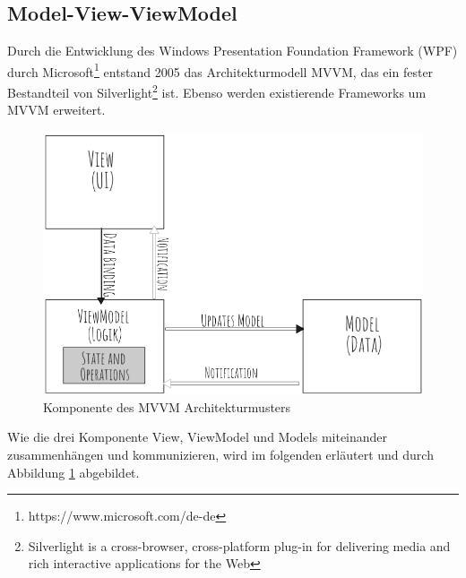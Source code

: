 \subsection{Model-View-ViewModel}
Durch die Entwicklung des Windows Presentation Foundation Framework (WPF) durch Microsoft\footnote{https://www.microsoft.com/de-de} entstand 2005 das Architekturmodell \ac{MVVM}, das ein fester Bestandteil von Silverlight\footnote{Silverlight is a cross-browser, cross-platform plug-in for delivering media and rich interactive applications for the Web} ist. Ebenso werden existierende Frameworks um \ac{MVVM} erweitert\cite{Jaeckle2015}.

\begin{figure}[h] 
\centering
\includegraphics[scale=0.45]{fig/mvvmv2.png} 
\caption{Komponente des MVVM Architekturmusters}
\label{fig:MVVM}
\end{figure} 
Wie die drei Komponente View, ViewModel und Models miteinander zusammenh\"angen und kommunizieren, wird im folgenden erl\"autert und durch Abbildung \ref{fig:MVVM} abgebildet.

